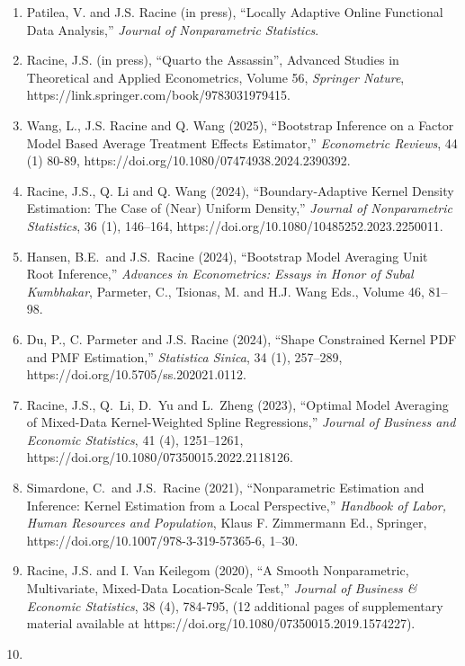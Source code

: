 \documentclass[
]{article}
\begin{document}
\begin{enumerate}
\def\labelenumi{\arabic{enumi}.}
\item
  Patilea, V. and J.S. Racine (in press), ``Locally Adaptive Online
  Functional Data Analysis,'' \emph{Journal of Nonparametric
  Statistics}.
\item
  Racine, J.S. (in press), ``Quarto the Assassin'', Advanced Studies in
  Theoretical and Applied Econometrics, Volume 56, \emph{Springer
  Nature}, https://link.springer.com/book/9783031979415.
\item
  Wang, L., J.S. Racine and Q. Wang (2025), ``Bootstrap Inference on a
  Factor Model Based Average Treatment Effects Estimator,''
  \emph{Econometric Reviews}, 44 (1) 80-89,
  https://doi.org/10.1080/07474938.2024.2390392.
\item
  Racine, J.S., Q. Li and Q. Wang (2024), ``Boundary-Adaptive Kernel
  Density Estimation: The Case of (Near) Uniform Density,''
  \emph{Journal of Nonparametric Statistics}, 36 (1), 146--164,
  https://doi.org/10.1080/10485252.2023.2250011.
\item
  Hansen, B.E.~and J.S.~Racine (2024), ``Bootstrap Model Averaging Unit
  Root Inference,'' \emph{Advances in Econometrics: Essays in Honor of
  Subal Kumbhakar}, Parmeter, C., Tsionas, M. and H.J. Wang Eds., Volume
  46, 81--98.
\item
  Du, P., C. Parmeter and J.S. Racine (2024), ``Shape Constrained Kernel
  PDF and PMF Estimation,'' \emph{Statistica Sinica}, 34 (1), 257--289,
  https://doi.org/10.5705/ss.202021.0112.
\item
  Racine, J.S., Q.~Li, D.~Yu and L.~Zheng (2023), ``Optimal Model
  Averaging of Mixed-Data Kernel-Weighted Spline Regressions,''
  \emph{Journal of Business and Economic Statistics}, 41 (4),
  1251--1261, https://doi.org/10.1080/07350015.2022.2118126.
\item
  Simardone, C.~and J.S.~Racine (2021), ``Nonparametric Estimation and
  Inference: Kernel Estimation from a Local Perspective,''
  \emph{Handbook of Labor, Human Resources and Population}, Klaus F.
  Zimmermann Ed., Springer, https://doi.org/10.1007/978-3-319-57365-6,
  1--30.
\item
  Racine, J.S. and I. Van Keilegom (2020), ``A Smooth Nonparametric,
  Multivariate, Mixed-Data Location-Scale Test,'' \emph{Journal of
  Business \& Economic Statistics}, 38 (4), 784-795, (12 additional
  pages of supplementary material available at
  https://doi.org/10.1080/07350015.2019.1574227).
\item

\end{enumerate}
\end{document}
